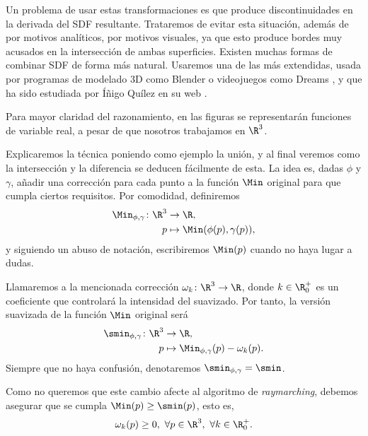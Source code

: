 Un problema de usar estas transformaciones es que produce discontinuidades en la derivada del SDF resultante. Trataremos de evitar esta situación, además de por motivos analíticos, por motivos visuales, ya que esto produce bordes muy acusados en la intersección de ambas superficies. Existen muchas formas de combinar SDF de forma más natural. Usaremos una de las más extendidas, usada por programas de modelado 3D como Blender \cite{repo:blender} o videojuegos como Dreams \cite{game:dreams}, y que ha sido estudiada por Íñigo Quílez en su web \cite{article:smooth}.

\begin{observacion}
    Para mayor claridad del razonamiento, en las figuras se representarán funciones de variable real, a pesar de que nosotros trabajamos en $\R^3$.
\end{observacion}

Explicaremos la técnica poniendo como ejemplo la unión, y al final veremos como la intersección y la diferencia se deducen fácilmente de esta. La idea es, dadas $\phi$ y $\gamma$, añadir una corrección para cada punto a la función $\Min$ original para que cumpla ciertos requisitos. Por comodidad, definiremos 
\begin{align*}
      \Min_{\phi,\gamma}\colon \R^3 &\to \R,\\
      p &\mapsto \Min(\phi(p),\gamma(p)),
\end{align*}
y siguiendo un abuso de notación, escribiremos $\Min(p)$ cuando no haya lugar a dudas.\newline

Llamaremos a la mencionada corrección $\omega_k\colon \R^3\to\R$, donde $k\in \R_0^+$ es un coeficiente que controlará la intensidad del suavizado. Por tanto, la versión suavizada de la función $\Min$ original será
\begin{align*}
      \smin_{\phi,\gamma}\colon \R^3 &\to \R,\\
      p &\mapsto \Min_{\phi,\gamma}(p) - \omega_k(p).
\end{align*}
Siempre que no haya confusión, denotaremos $\smin_{\phi,\gamma} = \smin$.\newline

Como no queremos que este cambio afecte al algoritmo de \textit{raymarching}, debemos asegurar que se cumpla $\Min(p)\ge \smin(p)$, esto es,
\begin{equation*}
\omega_k(p)\ge 0,\ \forall p\in \R^3,\ \forall k\in \R^+_0.
\end{equation*}

